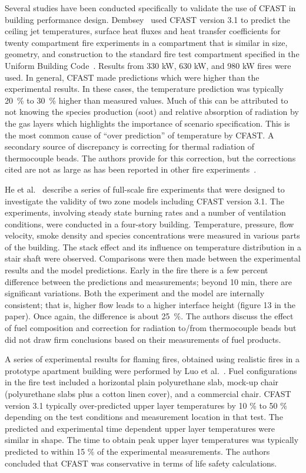 Several studies have been conducted specifically to validate the use of CFAST in building performance design. Dembsey~\cite{Valid:Dempsey} used CFAST version 3.1 to predict the ceiling jet temperatures, surface heat fluxes and heat transfer coefficients for twenty compartment fire experiments in a compartment that is similar in size, geometry, and construction to the standard fire test compartment specified in the Uniform Building Code~\cite{UBC}. Results from 330 kW, 630 kW, and 980 kW fires were used. In general, CFAST made predictions which were higher than the experimental results. In these cases, the temperature prediction was typically 20~\% to 30~\% higher than measured values. Much of this can be attributed to not knowing the species production (soot) and relative absorption of radiation by the gas layers which highlights the importance of scenario specification. This is the most common cause of  ``over prediction'' of temperature by CFAST. A secondary source of discrepancy is correcting for thermal radiation of thermocouple beads. The authors provide for this correction, but the corrections cited are not as large as has been reported in other fire experiments~\cite{Valid:Pitts}.

He et al.~\cite{Valid:He} describe a series of full-scale fire experiments that were designed to investigate the validity of two zone models including CFAST version 3.1. The experiments, involving steady state burning rates and a number of ventilation conditions, were conducted in a four-story building. Temperature, pressure, flow velocity, smoke density and species concentrations were measured in various parts of the building. The stack effect and its influence on temperature distribution in a stair shaft were observed. Comparisons were then made between the experimental results and the model predictions. Early in the fire there is a few percent difference between the predictions and measurements; beyond 10 min, there are significant variations. Both the experiment and the model are internally consistent; that is, higher flow leads to a higher interface height (figure 13 in the paper). Once again, the difference is about 25~\%. The authors discuss the effect of fuel composition and correction for radiation to/from thermocouple beads but did not draw firm conclusions based on their measurements of fuel products.

A series of experimental results for flaming fires, obtained using realistic fires in a prototype apartment building were performed by Luo et al.~\cite{Valid:Luo}. Fuel configurations in the fire test included a horizontal plain polyurethane slab, mock-up chair (polyurethane slabs plus a cotton linen cover), and a commercial chair. CFAST version 3.1 typically over-predicted upper layer temperatures by 10 \% to 50 \% depending on the test conditions and measurement location in that test. The predicted and experimental time dependent upper layer temperatures were similar in shape. The time to obtain peak upper layer temperatures was typically predicted to within 15 \% of the experimental measurements. The authors concluded that CFAST was conservative in terms of life safety calculations.

